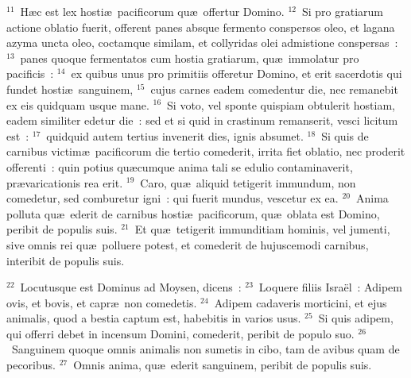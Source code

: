 ${}^{11}$~H\ae c est lex hosti\ae\ pacificorum qu\ae\ offertur Domino.
${}^{12}$~Si pro gratiarum actione oblatio fuerit, offerent panes absque fermento conspersos oleo, et lagana azyma uncta oleo, coctamque similam, et collyridas olei admistione conspersas~:
${}^{13}$~panes quoque fermentatos cum hostia gratiarum, qu\ae\ immolatur pro pacificis~:
${}^{14}$~ex quibus unus pro primitiis offeretur Domino, et erit sacerdotis qui fundet hosti\ae\ sanguinem,
${}^{15}$~cujus carnes eadem comedentur die, nec remanebit ex eis quidquam usque mane.
${}^{16}$~Si voto, vel sponte quispiam obtulerit hostiam, eadem similiter edetur die~: sed et si quid in crastinum remanserit, vesci licitum est~:
${}^{17}$~quidquid autem tertius invenerit dies, ignis absumet.
${}^{18}$~Si quis de carnibus victim\ae\ pacificorum die tertio comederit, irrita fiet oblatio, nec proderit offerenti~: quin potius qu\ae cumque anima tali se edulio contaminaverit, pr\ae varicationis rea erit.
${}^{19}$~Caro, qu\ae\ aliquid tetigerit immundum, non comedetur, sed comburetur igni~: qui fuerit mundus, vescetur ex ea.
${}^{20}$~Anima polluta qu\ae\ ederit de carnibus hosti\ae\ pacificorum, qu\ae\ oblata est Domino, peribit de populis suis.
${}^{21}$~Et qu\ae\ tetigerit immunditiam hominis, vel jumenti, sive omnis rei qu\ae\ polluere potest, et comederit de hujuscemodi carnibus, interibit de populis suis.


${}^{22}$~Locutusque est Dominus ad Moysen, dicens~:
${}^{23}$~Loquere filiis Isra\"el~: Adipem ovis, et bovis, et capr\ae\ non comedetis.
${}^{24}$~Adipem cadaveris morticini, et ejus animalis, quod a bestia captum est, habebitis in varios usus.
${}^{25}$~Si quis adipem, qui offerri debet in incensum Domini, comederit, peribit de populo suo.
${}^{26}$~Sanguinem quoque omnis animalis non sumetis in cibo, tam de avibus quam de pecoribus.
${}^{27}$~Omnis anima, qu\ae\ ederit sanguinem, peribit de populis suis.


